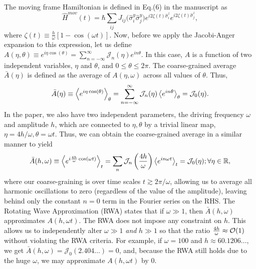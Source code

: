 \documentclass[aps,prb,reprint,showpacs,floatfix,superscriptaddress, onecolumn, 9pt]{revtex4-2}
\begin{document}
\begin{enumerate}
{    The moving frame Hamiltonian is defined in Eq.(6) in the manuscript as
    \begin{equation}
        \hat{H}^{mov}(t) = \hbar\sum_{ij} J_{ij} \Big(\hat{\sigma}^y_i\hat{\sigma}^y_j\Big) e^{i 2\zeta(t)\hat{\sigma}^z_i}  e^{i 2\zeta(t) \hat{\sigma}^z_j},
        \label{eq:hmov}
    \end{equation}
    where $\zeta(t)\equiv \frac{h}{\omega}[1-\cos(\omega t)]$. Now, before we apply the Jacobi-Anger expansion to this expression, let us define $ A(\eta,\theta)\equiv\displaystyle e^{i\eta \cos(\theta)} = \sum_{n=-\infty}^{\infty} \mathcal{J}_n(\eta)e^{in\theta} $. In this case, $A$ is a function of two independent variables, $\eta$ and $\theta$, and $0\leq\theta\leq 2\pi$. The coarse-grained average $\bar{A}(\eta)$ is defined as the average of $A(\eta, \omega)$ across all values of $\theta$. Thus,
    \begin{equation}
    \bar{A}(\eta) \equiv \expval{e^{i\eta\cos(\theta)}}_{\theta} = \sum_{n=-\infty}^{\infty} \mathcal{J}_n(\eta) \expval{e^{in\theta}}_{\theta} =\mathcal{J}_0(\eta).
    \end{equation}
In the paper, we also have two independent parameters, the driving frequency $\omega$ and amplitude $h$, which are connected to $\eta, \theta$ by a trivial linear map, $\eta=4h/\omega, \theta=\omega t$. Thus, we can obtain the coarse-grained average in a similar manner to yield
    \begin{equation}
        \bar{A}(h,\omega) \equiv \expval{e^{i\frac{4h}{\omega}\cos(\omega t)}}_t = \sum_n\mathcal{J}_n\left(\frac{4h}{\omega}\right)\expval{e^{i n \omega t}}_t = \mathcal{J}_0(\eta) ;  \forall{\eta}\in\mathbb{R},
        \label{eq:jacang}
    \end{equation}
where our coarse-graining is over time scales $t\gtrsim 2\pi/\omega$, allowing us to average all harmonic oscillations to zero (regardless of the value of the amplitude), leaving behind only the constant $n=0$ term in the Fourier series on the RHS. The Rotating Wave Approximation (RWA) states that if $\omega \gg 1$, then  $\bar{A}(h,\omega)$ approximates $A(h, \omega t)$. The RWA does not impose any constraint on $h$.
    This allows us to independently alter $\omega \gg 1$ \emph{and} $h \gg 1$ so that the ratio $\frac{4h}{\omega} \approx \order{1}$ without violating the RWA criteria. For example, if $\omega=100$ and $h\approx 60.1206\dots$, we get $\bar{A}(h,\omega)=\mathcal{J}_0(2.404\dots)=0$, and, because the RWA still holds due to the huge $\omega$, we may approximate $A(h,\omega t)$ by $0$.

}
\end{enumerate}
\end{document}
